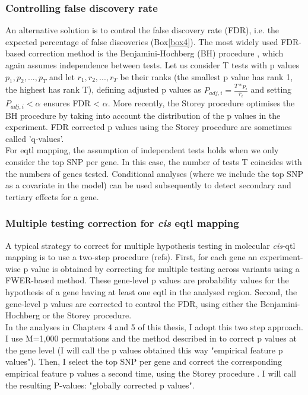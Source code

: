 \subsubsection{Controlling false discovery rate}

An alternative solution is to control the false discovery rate (FDR), i.e. the expected percentage of false discoveries (Box\ref{box4}).
The most widely used FDR-based correction method is the Benjamini-Hochberg (BH) procedure \cite{benjamini1995controlling}, which again assumes independence between tests. 
Let us consider T tests with p values $p_1, p_2, ..., p_T$ and let $r_1, r_2, ..., r_T$ be their ranks (the smallest p value has rank 1, the highest has rank T), defining adjusted p values as $P_{adj,i} = \frac{T*p_i}{r_i} $ and setting $P_{adj,i} <\alpha$ ensures FDR < $\alpha$.
More recently, the Storey procedure \cite{storey2002direct} optimises the BH procedure by taking into account the distribution of the p values in the experiment.
FDR corrected p values using the Storey procedure are sometimes called 'q-values'.\\


For e\gls{qtl} mapping, the assumption of independent tests holds when we only consider the top SNP per gene.
In this case, the number of tests T coincides with the numbers of genes tested.
Conditional analyses (where we include the top SNP as a covariate in the model) can be used subsequently to detect secondary and tertiary effects for a gene.

\subsubsection{Multiple testing correction for \textit{cis} e\gls{qtl} mapping}

A typical strategy to correct for multiple hypothesis testing in molecular \textit{cis}-\gls{qtl} mapping is to use a two-step procedure \cite{gtex2015genotype} (refs). 
First, for each gene an experiment-wise p value is obtained by correcting for multiple testing across variants using a FWER-based method. 
These gene-level p values are probability values for the hypothesis of a gene having at least
one e\gls{qtl} in the analysed region. 
Second, the gene-level p values are corrected to control the FDR, using either the Benjamini-Hochberg or the Storey procedure.\\

In the analyses in Chapters 4 and 5 of this thesis, I adopt this two step approach.
I use M=1,000 permutations and the method described in \cite{ongen2016fast} to correct p values at the gene level (I will call the p values obtained this way "empirical feature p values").
Then, I select the top SNP per gene and correct the corresponding empirical feature p values a second time, using the Storey procedure \cite{storey2002direct}.
I will call the resulting P-values: "globally corrected p values".

